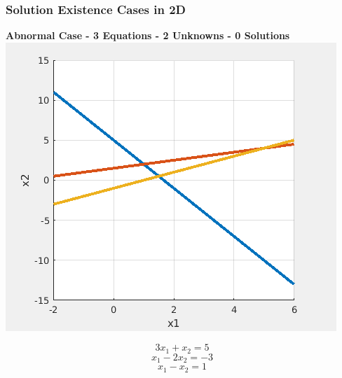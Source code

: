 \documentclass[fleqn]{beamer} %
\newcommand{\sectionIIIsubsectionIIItitle}{Solution Existence Cases in 2D}
\begin{document}
			\begin{frame}
				\frametitle{\sectionIIIsubsectionIIItitle}
				\bigskip

				{\bf Abnormal Case - 3 Equations - 2 Unknowns - 0 Solutions} \\ \vspace{2mm}
				\includegraphics[scale=.3]{images/lecture5_fig4.png} \\
				\begin{fleqn}
				\[3x_1+x_2=5\]
				\[x_1-2x_2=-3\]
				\[x_1-x_2=1\]
				\end{fleqn}

				\btVFill
			\end{frame}
\end{document}
